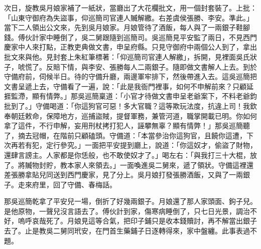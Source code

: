 \begin{showcontents}{}
次日，旋教吳月娘家補了一紙狀，當廳出了大花欄批文，用一個封套裝了。上批：「山東守御府為失盜事，仰巡簡司官連人贓解繳。右差虞侯張勝、李安。準此。」 當下二人領出公文來，先到吳月娘家。月娘管待了酒飯，每人與了一兩銀子鞋腳錢。傅伙計家中睡倒了，吳二舅跟隨到巡簡司。吳巡簡見平安監了兩日，不見西門慶家中人來打點，正教吏典做文書，申呈府縣。只見守御府中兩個公人到了，拿出批文來與他。見封套上朱紅筆標著：「仰巡簡司官連人解繳」，拆開，見裡面吳氏狀子，唬慌了。反賠下情，與李安、張勝每人二兩銀子。隨即做文書解人上去。到於守備府前，伺候半日。待的守備升廳，兩邊軍牢排下，然後帶進入去。這吳巡簡把文書呈遞上去，守備看了一遍，說：「此是我衙門裡事，如何不申解前來？只顧延捱監滯，顯有情弊。」那吳巡簡稟道：「小官才待做文書申呈老爺案下，不料老爺鈞批到了。」守備喝道：「你這狗官可惡！多大官職？這等欺玩法度，抗違上司！我欽奉朝廷敕命，保障地方，巡捕盜賊，提督軍務，兼管河道，職掌開載已明。你如何拿了這件，不行申解，妄用刑杖拷打犯人，誣攀無辜？顯有情弊！」那吳巡簡聽了，摘去冠帽，在階前只顧磕頭。守備道：「本當參治你這狗官，且饒你這遭，下次再若有犯，定行參究。」一面把平安提到廳上，說道：「你這奴才，偷盜了財物，還肆言謗主。人家都是你恁般，也不敢使奴才了。」喝左右：「與我打三十大棍，放了。將贓物封貯，教本家人來領去。」一面喚進吳二舅來，遞了領狀。守備這裡還差張勝拿貼兒同送到西門慶家，見了分上。吳月娘打發張勝酒飯，又與了一兩銀子。走來府里，回了守備、春梅話。

那吳巡簡乾拿了平安兒一場，倒折了好幾兩銀子。月娘還了那人家頭面、鉤子兒。是他原物，一聲兒沒言語去了。傅伙計到家，傷寒病睡倒了，只七日光景，調治不好，嗚呼哀哉死了。月娘見這等合氣，把印子鋪只是收本錢贖討，再不解當出銀子去了。止是教吳二舅同玳安，在門首生藥鋪子日逐轉得來，家中盤纏。此事表過不題。


\end{showcontents}
